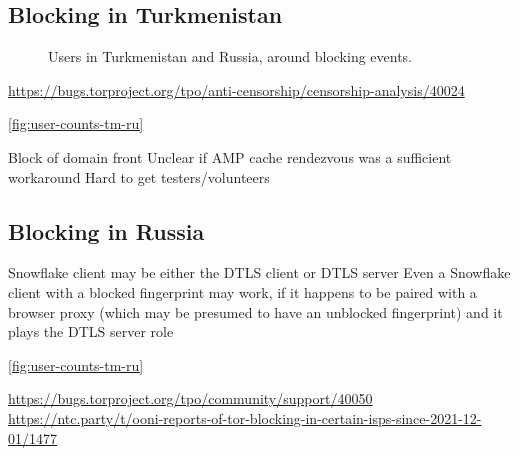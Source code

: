\documentclass[letterpaper,twocolumn]{article}
\begin{document}


\subsection{Blocking in Turkmenistan}
\label{sec:block-tm}

\begin{figure}
\caption{
Users in Turkmenistan and Russia,
around blocking events.
}
\label{fig:user-counts-tm-ru}
\end{figure}


\url{https://bugs.torproject.org/tpo/anti-censorship/censorship-analysis/40024}

\autoref{fig:user-counts-tm-ru}

Block of domain front
Unclear if AMP cache rendezvous was a sufficient workaround
Hard to get testers/volunteers

\subsection{Blocking in Russia}
\label{sec:block-ru}



Snowflake client may be either the DTLS client or DTLS server
Even a Snowflake client with a blocked fingerprint may work,
if it happens to be paired with a browser proxy (which may be presumed to have an unblocked fingerprint)
and it plays the DTLS server role


\autoref{fig:user-counts-tm-ru}

\url{https://bugs.torproject.org/tpo/community/support/40050}
\url{https://ntc.party/t/ooni-reports-of-tor-blocking-in-certain-isps-since-2021-12-01/1477}
\end{document}
